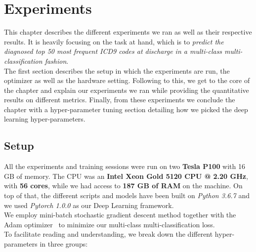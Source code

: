 \chapter{Experiments}
\label{chap:Experiments}
This chapter describes the different experiments we ran as well as their respective results. It is heavily focusing on the task at hand, which is to \emph{predict the diagnosed top 50 most frequent ICD9 codes at discharge in a multi-class multi-classification fashion}. \\

The first section describes the setup in which the experiments are run, the optimizer as well as the hardware setting. Following to this, we get to the core of the chapter and explain our experiments we ran while providing the quantitative results on different metrics. Finally, from these experiments we conclude the chapter with a hyper-parameter tuning section detailing how we picked the deep learning hyper-parameters.

\section{Setup}
\label{sec:Setup}
All the experiments and training sessions were run on two \textbf{Tesla P100} with 16 GB of memory. The CPU was an \textbf{Intel Xeon Gold 5120 CPU @ 2.20 GHz}, with \textbf{56 cores}, while we had access to \textbf{187 GB of RAM} on the machine. On top of that, the different scripts and models have been built on \textit{Python 3.6.7} and we used \textit{Pytorch 1.0.0} as our Deep Learning framework. \\

We  employ  mini-batch  stochastic gradient descent method together with the Adam optimizer~\cite{DBLP:journals/corr/KingmaB14} to  minimize  our multi-class multi-classification loss. \\

To facilitate reading and understanding, we break down the different hyper-parameters in three groups:

